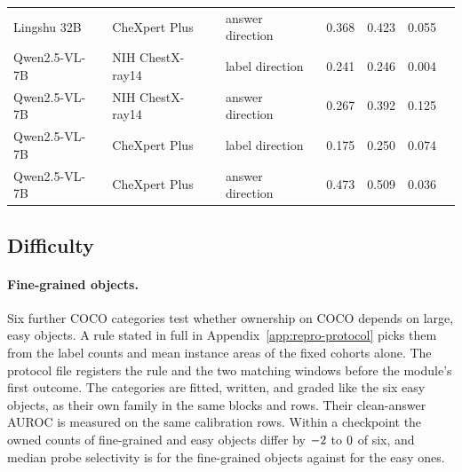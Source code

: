 \documentclass[11pt]{article}
\begin{document}
\begin{table}[tp]
{\begin{tabular}{lllcccc}
Lingshu 32B & CheXpert Plus & answer direction & 0.368 & 0.423 & 0.055 & \\
Qwen2.5-VL-7B & NIH ChestX-ray14 & label direction & 0.241 & 0.246 & 0.004 & \\
Qwen2.5-VL-7B & NIH ChestX-ray14 & answer direction & 0.267 & 0.392 & 0.125 & \\
Qwen2.5-VL-7B & CheXpert Plus & label direction & 0.175 & 0.250 & 0.074 & \\
Qwen2.5-VL-7B & CheXpert Plus & answer direction & 0.473 & 0.509 & 0.036 & \\
\bottomrule
\end{tabular}}
\end{table}


\subsection{Difficulty}
\label{app:cf-difficulty}

\paragraph{Fine-grained objects.} Six further COCO categories test whether ownership on COCO depends on large, easy objects. A rule stated in full in Appendix~\ref{app:repro-protocol} picks them from the label counts and mean instance areas of the fixed cohorts alone. The protocol file registers the rule and the two matching windows before the module's first outcome. The categories are fitted, written, and graded like the six easy objects, as their own family in the same blocks and rows. Their clean-answer AUROC is measured on the same calibration rows. Within a checkpoint the owned counts of fine-grained and easy objects differ by $-2$ to $0$ of six, and median probe selectivity is \cfFgFineSel{} for the fine-grained objects against \cfFgEasySameSel{} for the easy ones.
\end{document}
